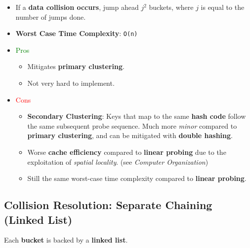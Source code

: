 \documentclass[12pt, letterpaper]{article}
\begin{document}
\begin{itemize}
    \item If a \textbf{data collision occurs}, jump ahead $ j^2 $ buckets, where $ j $ is equal to the number of jumps done.
    \item \textbf{Worst Case Time Complexity}: \texttt{O(n)}
    \item \textcolor{green}{Pros}
        \begin{itemize}
            \item Mitigates \textbf{primary clustering}.
            \item Not very hard to implement.
        \end{itemize}
    \item \textcolor{red}{Cons}
        \begin{itemize}
            \item \textbf{Secondary Clustering}: Keys that map to the same \textbf{hash code} follow the same subsequent probe sequence. Much more \textit{minor} compared to \textbf{primary clustering}, and can be mitigated with \textbf{double hashing}.
            \item Worse \textbf{cache efficiency} compared to \textbf{linear probing} due to the exploitation of \textit{spatial locality}. (see \textit{Computer Organization})
            \item Still the same worst-case time complexity compared to \textbf{linear probing}.
        \end{itemize}
\end{itemize}

\subsection*{Collision Resolution: Separate Chaining (Linked List)}

Each \textbf{bucket} is backed by a \textbf{linked list}.
\end{document}
